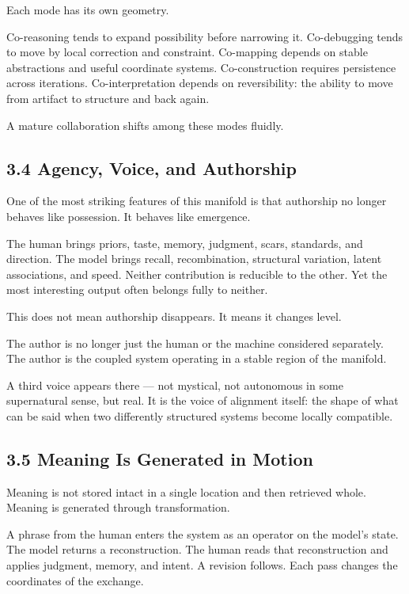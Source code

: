 Each mode has its own geometry.

Co-reasoning tends to expand possibility before narrowing it.
Co-debugging tends to move by local correction and constraint.
Co-mapping depends on stable abstractions and useful coordinate systems.
Co-construction requires persistence across iterations.
Co-interpretation depends on reversibility: the ability to move from
artifact to structure and back again.

A mature collaboration shifts among these modes fluidly.

\hypertarget{agency-voice-and-authorship}{%
\subsection{3.4 Agency, Voice, and
Authorship}\label{agency-voice-and-authorship}}

One of the most striking features of this manifold is that authorship no
longer behaves like possession. It behaves like emergence.

The human brings priors, taste, memory, judgment, scars, standards, and
direction. The model brings recall, recombination, structural variation,
latent associations, and speed. Neither contribution is reducible to the
other. Yet the most interesting output often belongs fully to neither.

This does not mean authorship disappears. It means it changes level.

The author is no longer just the human or the machine considered
separately. The author is the coupled system operating in a stable
region of the manifold.

A third voice appears there --- not mystical, not autonomous in some
supernatural sense, but real. It is the voice of alignment itself: the
shape of what can be said when two differently structured systems become
locally compatible.

\hypertarget{meaning-is-generated-in-motion}{%
\subsection{3.5 Meaning Is Generated in
Motion}\label{meaning-is-generated-in-motion}}

Meaning is not stored intact in a single location and then retrieved
whole. Meaning is generated through transformation.

A phrase from the human enters the system as an operator on the model's
state. The model returns a reconstruction. The human reads that
reconstruction and applies judgment, memory, and intent. A revision
follows. Each pass changes the coordinates of the exchange.

